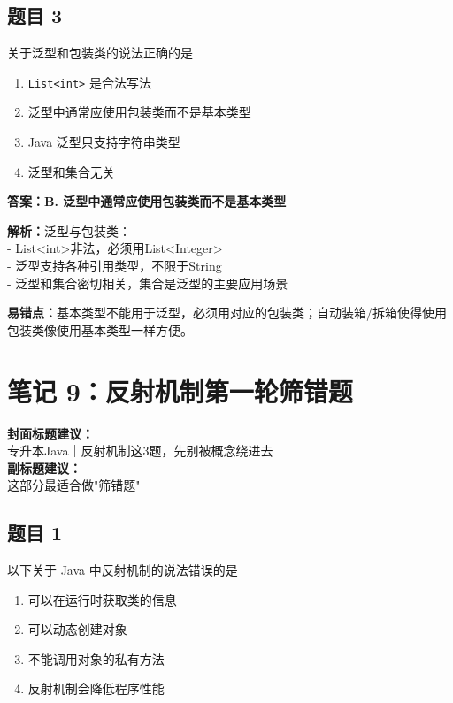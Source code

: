 \documentclass[12pt,a4paper]{ctexart}
\begin{document}
\subsection*{题目 3}
关于泛型和包装类的说法正确的是
\begin{enumerate}[label=\Alph*.]
	\item \texttt{List<int>} 是合法写法
	\item 泛型中通常应使用包装类而不是基本类型
	\item Java 泛型只支持字符串类型
	\item 泛型和集合无关
\end{enumerate}

\begin{answerbox}
	\textbf{答案：B. 泛型中通常应使用包装类而不是基本类型}

	\textbf{解析：}泛型与包装类：\\
	- List<int>非法，必须用List<Integer>\\
	- 泛型支持各种引用类型，不限于String\\
	- 泛型和集合密切相关，集合是泛型的主要应用场景

	\textbf{易错点：}基本类型不能用于泛型，必须用对应的包装类；自动装箱/拆箱使得使用包装类像使用基本类型一样方便。
\end{answerbox}

\newpage

\section{笔记 9：反射机制第一轮筛错题}
\begin{coverbox}
	\textbf{封面标题建议：}\\
	专升本Java｜反射机制这3题，先别被概念绕进去\\
	\textbf{副标题建议：}\\
	这部分最适合做"筛错题"
\end{coverbox}

\subsection*{题目 1}
以下关于 Java 中反射机制的说法错误的是
\begin{enumerate}[label=\Alph*.]
	\item 可以在运行时获取类的信息
	\item 可以动态创建对象
	\item 不能调用对象的私有方法
	\item 反射机制会降低程序性能
\end{enumerate}
\end{document}

